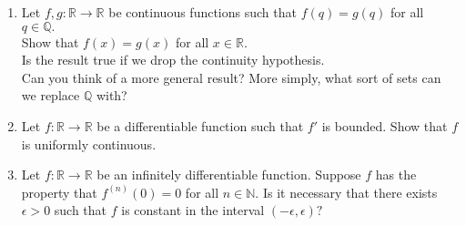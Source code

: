 \documentclass{article}
\begin{document}
\begin{enumerate}
	\item Let $f, g: \mathbb{R} \to \mathbb{R}$ be continuous functions such that $f(q) = g(q)$ for all $q \in \mathbb{Q}.$\\
	Show that $f(x) = g(x)$ for all $x \in \mathbb{R}.$\\
	Is the result true if we drop the continuity hypothesis.\\
	Can you think of a more general result? More simply, what sort of sets can we replace $\mathbb{Q}$ with?
	\item Let $f:\mathbb{R} \to \mathbb{R}$ be a differentiable function such that $f'$ is bounded. Show that $f$ is uniformly continuous.
	\item Let $f:\mathbb{R} \to \mathbb{R}$ be an infinitely differentiable function. Suppose $f$ has the property that $f^{(n)}(0) = 0$ for all $n \in \mathbb{N}.$ Is it necessary that there exists $\epsilon > 0$ such that $f$ is constant in the interval $(-\epsilon, \epsilon)?$
\end{enumerate}
\end{document}
